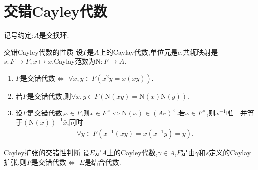 \section{交错Cayley代数}

记号约定:$A$是交换环.

\begin{proposition}{交错Cayley代数的性质}{}
	设$F$是$A$上的Caylay代数,单位元是$e$,共轭映射是$s:F\to F,x\mapsto\bar{x}$,Caylay范数为$\mathrm{N}:F\to A$.
	\begin{enumerate}
		\item $F$是交错代数$\iff$ $\forall x,y\in F\left(x^{2}y=x\left(xy\right)\right)$.
		\item 若$F$是交错代数,则$\forall x,y\in F\left(\mathrm{N}\left(xy\right)=\mathrm{N}\left(x\right)\mathrm{N}\left(y\right)\right)$.
		\item 设$F$是交错代数,$x\in F$,则$x\in F^{\times}\iff\mathrm{N}\left(x\right)\in\left(Ae\right)^{\times}$.若$x\in F^{\times}$,则$x^{-1}$唯一并等于$\left(\mathrm{N}\left(x\right)\right)^{-1}\bar{x}$,同时
		\begin{align*}
			\forall y\in F\left(x^{-1}\left(xy\right)=x\left(x^{-1}y\right)=y\right).
		\end{align*}
	\end{enumerate}
\end{proposition}

\begin{proposition}{Cayley扩张的交错性判断}{}
	设$E$是$A$上的Cayley代数,$\gamma\in A$,$F$是由$\gamma$和$s$定义的Caylay扩张,则$F$是交错代数$\iff$ $E$是结合代数.
\end{proposition}
































